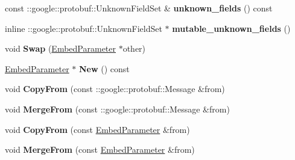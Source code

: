 \begin{DoxyCompactItemize}
\item 
\mbox{\label{classcaffe_1_1_embed_parameter_a629032564615bdae407c0a4bd47406db}} 
const \+::google\+::protobuf\+::\+Unknown\+Field\+Set \& {\bfseries unknown\+\_\+fields} () const
\item 
\mbox{\label{classcaffe_1_1_embed_parameter_a9f581a0a11301a46b388ede9697a1099}} 
inline \+::google\+::protobuf\+::\+Unknown\+Field\+Set $\ast$ {\bfseries mutable\+\_\+unknown\+\_\+fields} ()
\item 
\mbox{\label{classcaffe_1_1_embed_parameter_a17b6b7b2f1e36fa5bcb3eea0afabcb64}} 
void {\bfseries Swap} (\mbox{\hyperlink{classcaffe_1_1_embed_parameter}{Embed\+Parameter}} $\ast$other)
\item 
\mbox{\label{classcaffe_1_1_embed_parameter_ac605533532f3edd7cb2859fe8c4d0044}} 
\mbox{\hyperlink{classcaffe_1_1_embed_parameter}{Embed\+Parameter}} $\ast$ {\bfseries New} () const
\item 
\mbox{\label{classcaffe_1_1_embed_parameter_ac5d59d0029474a9a41ed8ff805419e65}} 
void {\bfseries Copy\+From} (const \+::google\+::protobuf\+::\+Message \&from)
\item 
\mbox{\label{classcaffe_1_1_embed_parameter_afe6e8d2cbbb67c3a08ced52baf0825be}} 
void {\bfseries Merge\+From} (const \+::google\+::protobuf\+::\+Message \&from)
\item 
\mbox{\label{classcaffe_1_1_embed_parameter_ac69471660ebe6d9fc2eb2135a3142653}} 
void {\bfseries Copy\+From} (const \mbox{\hyperlink{classcaffe_1_1_embed_parameter}{Embed\+Parameter}} \&from)
\item 
\mbox{\label{classcaffe_1_1_embed_parameter_a8b53699ecc0e8165830d13e96fb0a4f7}} 
void {\bfseries Merge\+From} (const \mbox{\hyperlink{classcaffe_1_1_embed_parameter}{Embed\+Parameter}} \&from)
\item 
\mbox{\label{classcaffe_1_1_embed_parameter_aa00fc520d7c92a9fcb0c052a92cfb78b}} 

\end{DoxyCompactItemize}
